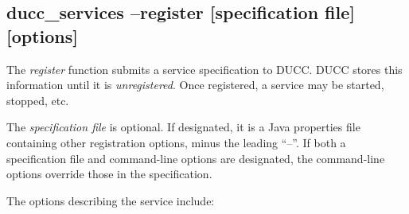     \subsection{ducc\_services --register [specification file] [options]}
    \label{subsec:cli.ducc-services.register}
       The {\em register} function submits a service specification to DUCC.  DUCC stores this 
       information until it is {\em unregistered}.  Once registered, a service may be
       started, stopped, etc.

       The {\em specification file} is optional.  If designated, it is a Java properties file
       containing other registration options, minus the leading ``--''.  If both a specification
       file and command-line options are designated, the command-line options override those in
       the specification.
                                     
       The options describing the service include:

